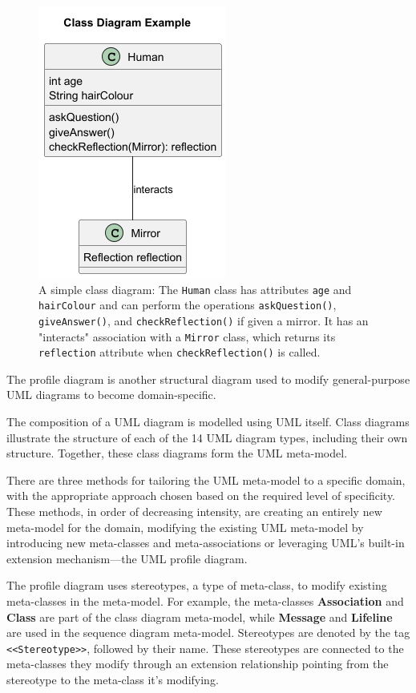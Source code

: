 \documentclass{article}
\newcounter{subsubsubsection}[subsubsection]
\begin{document}
{\begin{figure}[H]
    \centering
\includegraphics[width=0.4\linewidth]{CDexample-Class_Diagram_Example.png}
    \caption{A simple class diagram: The \texttt{Human} class has attributes \texttt{age} and \texttt{hairColour} and can perform the operations \texttt{askQuestion()}, \texttt{giveAnswer()}, and \texttt{checkReflection()} if given a mirror. It has an "interacts" association with a \texttt{Mirror} class, which returns its \texttt{reflection} attribute when \texttt{checkReflection()} is called.}
    \label{fig:Simple CD}
    \end{figure}


The profile diagram is another structural diagram used to modify general-purpose UML diagrams to become domain-specific.

The composition of a UML diagram is modelled using UML itself. Class diagrams illustrate the structure of each of the 14 UML diagram types, including their own structure. Together, these class diagrams form the UML meta-model\cite{Seidl_Scholz_Huemer_Kappel_Duffy_2014}.

There are three methods for tailoring the UML meta-model to a specific domain, with the appropriate approach chosen based on the required level of specificity. These methods, in order of decreasing intensity, are creating an entirely new meta-model for the domain, modifying the existing UML meta-model by introducing new meta-classes and meta-associations or leveraging UML's built-in extension mechanism—the UML profile diagram\cite{Seidl_Scholz_Huemer_Kappel_Duffy_2014}.

The profile diagram uses stereotypes, a type of meta-class, to modify existing meta-classes in the meta-model. For example, the meta-classes \textbf{Association} and \textbf{Class} are part of the class diagram meta-model, while \textbf{Message} and \textbf{Lifeline} are used in the sequence diagram meta-model. Stereotypes are denoted by the tag \texttt{<<Stereotype>>}, followed by their name. These stereotypes are connected to the meta-classes they modify through an extension relationship pointing from the stereotype to the meta-class it's modifying\cite{Seidl_Scholz_Huemer_Kappel_Duffy_2014}.

}
\end{document}

